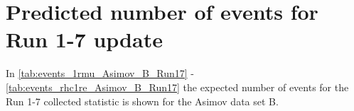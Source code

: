 
%
%

\section{Predicted number of events for Run 1-7 update}
\label{app:events_run17}

In \cref{tab:events_1rmu_Asimov_B_Run17} - \ref{tab:events_rhc1re_Asimov_B_Run17} 
the expected number of events for the Run 1-7 collected statistic is shown for the Asimov data set B.






\clearpage




